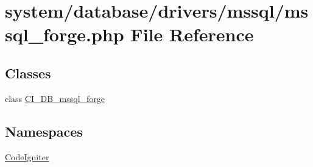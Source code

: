 \hypertarget{mssql__forge_8php}{}\section{system/database/drivers/mssql/mssql\+\_\+forge.php File Reference}
\label{mssql__forge_8php}
\subsection*{Classes}
\begin{DoxyCompactItemize}
\item 
class \mbox{\hyperlink{class_c_i___d_b__mssql__forge}{C\+I\+\_\+\+D\+B\+\_\+mssql\+\_\+forge}}
\end{DoxyCompactItemize}
\subsection*{Namespaces}
\begin{DoxyCompactItemize}
\item 
 \mbox{\hyperlink{namespace_code_igniter}{Code\+Igniter}}
\end{DoxyCompactItemize}
